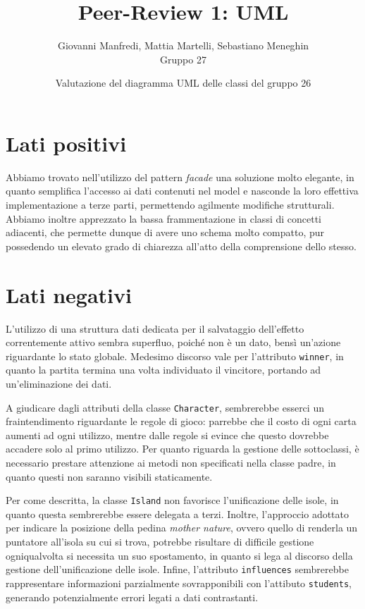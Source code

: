 \documentclass[12pt]{article}
\title{Peer-Review 1: UML}
\author{Giovanni Manfredi, Mattia Martelli, Sebastiano Meneghin\\Gruppo 27}
\date{Valutazione del diagramma UML delle classi del gruppo 26}
\begin{document}
\maketitle

\thispagestyle{empty}

\section*{Lati positivi}

Abbiamo trovato nell'utilizzo del pattern \emph{facade} una soluzione molto elegante, in quanto semplifica l'accesso ai dati contenuti nel model e nasconde
la loro effettiva implementazione a terze parti, permettendo agilmente modifiche strutturali. Abbiamo inoltre apprezzato la bassa frammentazione in classi di
concetti adiacenti, che permette dunque di avere uno schema molto compatto, pur possedendo un elevato grado di chiarezza all'atto della comprensione
dello stesso.

\section*{Lati negativi}

L'utilizzo di una struttura dati dedicata per il salvataggio dell'effetto correntemente attivo sembra superfluo, poiché non è un dato, bensì un'azione
riguardante lo stato globale. Medesimo discorso vale per l'attributo \texttt{winner}, in quanto la partita termina una volta individuato il vincitore,
portando ad un'eliminazione dei dati.

A giudicare dagli attributi della classe \texttt{Character}, sembrerebbe esserci un fraintendimento riguardante le regole di gioco: parrebbe che il costo di
ogni carta aumenti ad ogni utilizzo, mentre dalle regole si evince che questo dovrebbe accadere solo al primo utilizzo. Per quanto riguarda la gestione
delle sottoclassi, è necessario prestare attenzione ai metodi non specificati nella classe padre, in quanto questi non saranno visibili staticamente.

Per come descritta, la classe \texttt{Island} non favorisce l'unificazione delle isole, in quanto questa sembrerebbe essere delegata a terzi.  Inoltre,
l'approccio adottato per indicare la posizione della pedina \emph{mother nature}, ovvero quello di renderla un puntatore all'isola su cui si trova,
potrebbe risultare di difficile gestione ogniqualvolta si necessita un suo spostamento, in quanto si lega al discorso della gestione dell'unificazione
delle isole. Infine, l'attributo \texttt{influences} sembrerebbe rappresentare informazioni parzialmente sovrapponibili con l'attibuto \texttt{students},
generando potenzialmente errori legati a dati contrastanti.
\end{document}
